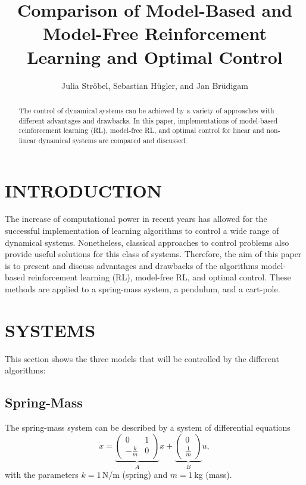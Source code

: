 \documentclass[letterpaper, 10 pt, conference]{ieeeconf}  %
\title{\LARGE \bf
Comparison of Model-Based and Model-Free Reinforcement Learning and Optimal Control
}
\author{Julia Str\"obel, Sebastian H\"ugler, and Jan Br\"udigam}
\begin{document}
\maketitle
\thispagestyle{empty}
\pagestyle{empty}


\begin{abstract}

The control of dynamical systems can be achieved by a variety of approaches with different advantages and drawbacks. In this paper, implementations of model-based reinforcement learning (RL), model-free RL, and optimal control for linear and non-linear dynamical systems are compared and discussed.

\end{abstract}


\section{INTRODUCTION}

The increase of computational power in recent years has allowed for the successful implementation of learning algorithms to control a wide range of dynamical systems. Nonetheless, classical approaches to control problems also provide 
useful solutions for this class of systems. Therefore, the aim of this paper is to present and discuss advantages and drawbacks of the algorithms model-based reinforcement learning (RL), model-free RL, and optimal control. These methods are applied to a spring-mass system, a pendulum, and a cart-pole.
\section{SYSTEMS}
This section shows the three models that will be controlled by the different algorithms:
\subsection{Spring-Mass}
The spring-mass system can be described by a system of differential equations
\begin{equation}\label{eqn:JanSMsys}
	\dot{x}=
	\underbrace{
		\left( {\begin{array}{cc}
			0 &1\\
			-\frac{k}{m} &0\end{array} } \right)}_{A}x + 
	\underbrace{
		\left( {\begin{array}{cc}
		0\\
		\frac{1}{m}\end{array} } \right)}_{B}u,
\end{equation}
with the parameters $k=1$\,N/m (spring) and $m=1$\,kg (mass).
\end{document}
